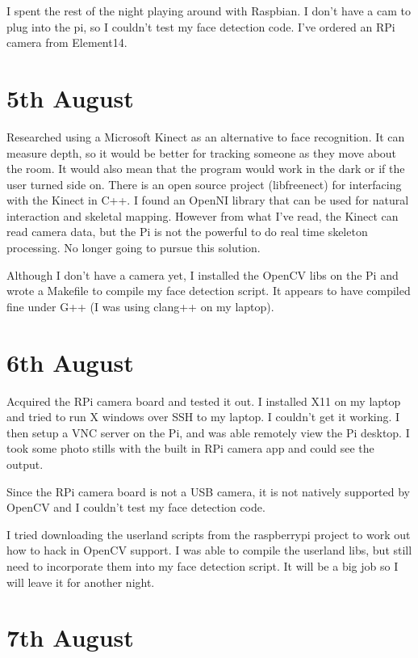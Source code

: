 I spent the rest of the night playing around with Raspbian. I don't have a cam to plug into the pi, so I couldn't test my face detection code. I've ordered an RPi camera from Element14.



\section*{5th August}

Researched using a Microsoft Kinect as an alternative to face recognition. It can measure depth, so it would be better for tracking someone as they move about the room. It would also mean that the program would work in the dark or if the user turned side on. There is an open source project (libfreenect) for interfacing with the Kinect in C++. I found an OpenNI library that can be used for natural interaction and skeletal mapping. However from what I've read, the Kinect can read camera data, but the Pi is not the powerful to do real time skeleton processing. No longer going to pursue this solution.

Although I don't have a camera yet, I installed the OpenCV libs on the Pi and wrote a Makefile to compile my face detection script. It appears to have compiled fine under G++ (I was using clang++ on my laptop).



\section*{6th August}

Acquired the RPi camera board and tested it out. I installed X11 on my laptop and tried to run X windows over SSH to my laptop. I couldn't get it working. I then setup a VNC server on the Pi, and was able remotely view the Pi desktop. I took some photo stills with the built in RPi camera app and could see the output.

Since the RPi camera board is not a USB camera, it is not natively supported by OpenCV and I couldn't test my face detection code.

I tried downloading the userland scripts from the raspberrypi project to work out how to hack in OpenCV support. I was able to compile the userland libs, but still need to incorporate them into my face detection script. It will be a big job so I will leave it for another night.


\section*{7th August}

